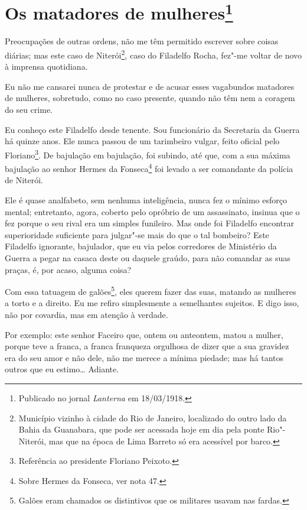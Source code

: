 \chapter[Os matadores de mulheres]{Os matadores de mulheres\footnote[*]{Publicado no jornal \emph{Lanterna} em 18/03/1918.}}

Preocupações de outras ordens, não me têm permitido escrever sobre
coisas diárias; mas este caso de Niterói\footnote{Município vizinho à
  cidade do Rio de Janeiro, localizado do outro lado da Bahia da
  Guanabara, que pode ser acessada hoje em dia pela ponte Rio"-Niterói,
  mas que na época de Lima Barreto só era acessível por barco.}, caso do
Filadelfo Rocha, fez"-me voltar de novo à imprensa quoti­diana.

Eu não me cansarei nunca de protestar e de acusar esses vagabundos
matadores de mulheres, sobretudo, como no caso presente, quando não têm
nem a coragem do seu crime.

Eu conheço este Filadelfo desde tenente. Sou funcio­nário da Secretaria
da Guerra há quinze anos. Ele nunca passou de um tarimbeiro vulgar,
feito oficial pelo Floriano\footnote{Referência ao presidente Floriano
  Peixoto.}. De bajulação em bajulação, foi subindo, até que, com a sua
máxima bajulação ao senhor Hermes da Fonseca\footnote{Sobre Hermes da
  Fonseca, ver nota 47.} foi levado a ser comandante da polícia de
Niterói.

Ele é quase analfabeto, sem nenhuma inteligência, nunca fez o mínimo
esforço mental; entretanto, agora, coberto pelo opróbrio de um
assassinato, insinua que o fez porque o seu rival era um simples
funileiro. Mas onde foi Filadelfo en­contrar superioridade suficiente
para julgar"-se mais do que o tal bombeiro? Este Filadelfo ignorante,
bajulador, que eu via pelos corredores de Ministério da Guerra a pegar
na casaca deste ou daquele graúdo, para não comandar as suas praças, é,
por acaso, alguma coisa?

Com essa tatuagem de galões\footnote{Galões eram chamados os distintivos
  que os militares usavam nas fardas.}, eles querem fazer das suas,
matando as mulheres a torto e a direito. Eu me refiro simplesmente a
semelhantes sujeitos. E digo isso, não por covardia, mas em atenção à
verdade.

Por exemplo: este senhor Faceiro que, ontem ou anteontem, matou a
mulher, porque teve a franca, a franca franqueza orgulhosa de dizer que
a sua gravidez era do seu amor e não dele, não me merece a mínima
piedade; mas há tantos outros que eu estimo\ldots{} Adiante.


